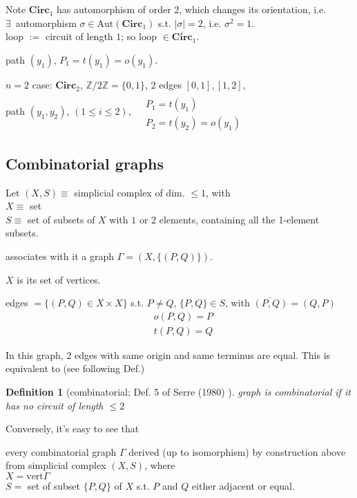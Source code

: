 \documentclass[10pt]{amsart}
\newtheorem{definition}{Definition}
\begin{document}
\begin{multicols*}{2}
	Note $\mathbf{\text{Circ}}_1$ has automorphism of order 2, which changes its orientation, i.e. \\
	$\exists \, $ automorphism $\sigma \in \text{Aut}( \mathbf{\text{Circ}}_1) $ s.t. $|\sigma | = 2$, i.e. $\sigma^2=1$.  \\
	loop $:= $ circuit of length $1$; so loop $\in \overline{ \mathbf{\text{Circ}} }_1$.  
	
	path $(y_1)$, $P_1 = t(y_1) = o(y_1)$.  
	
	$n=2$ case: $\mathbf{\text{Circ}}_2$, $\mathbb{Z}/2\mathbb{Z} = \lbrace 0 ,1\rbrace$, 2 edges $[0,1], [1,2]$,  \\
	path $(y_1,y_2)$, $(1\leq i \leq 2)$, $\begin{aligned} & \quad \\
		& P_1 = t(y_1) \\
		& P_2 = t(y_2) = o(y_1) \end{aligned}$  
		
		
	

\subsection{Combinatorial graphs}

Let $(X,S)\equiv $ simplicial complex of dim. $\leq 1$, with \\
$X \equiv $ set \\
$S \equiv $ set of subsets of $X$ with $1$ or $2$ elements, containing all the 1-element subsets.  

associates with it a graph $\Gamma = (X, \lbrace (P,Q) \rbrace)$.  

$X$ is its set of vertices.  

edges $=\lbrace (P,Q)\in X\times X\rbrace$ s.t. $P\neq Q$, $\lbrace P ,Q \rbrace \in S$, with $\overline{(P,Q)} = (Q,P)$
\[
\begin{aligned}
& o(P,Q) = P \\
& t(P,Q) = Q
\end{aligned}
\]

In this graph, 2 edges with same origin and same terminus are equal.  This is equivalent to (see following Def.)

\begin{definition}[combinatorial; Def. 5 of Serre (1980) \cite{Serr1980}]
	graph is combinatorial if it has no circuit of length $\leq 2$
\end{definition}
Conversely, it's easy to see that 

every combinatorial graph $\Gamma$ derived (up to isomorphism) by construction above from simplicial complex $(X,S)$, where \\
$X = \text{vert} \Gamma$ \\
$S=$ set of subset $\lbrace P,Q \rbrace$ of $X$ s.t. $P$ and $Q$ either adjacent or equal. 


\end{multicols*}
\end{document}

